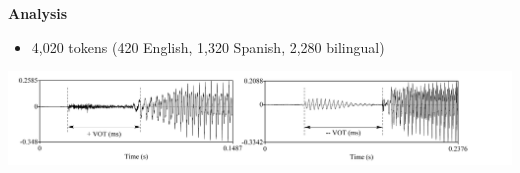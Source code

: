 \documentclass[a0paper,portrait,columns=2]{baposter}
\begin{document}
\begin{poster}
{\textbf{Analysis}
\vspace{.05in}
\begin{itemize}
	\item 4,020 tokens (420 English, 1,320 Spanish, 2,280 bilingual)
\end{itemize}
\vspace{-.2in}
\begin{center}	
	\includegraphics[width=1.05\textwidth]{praat2.png}
\end{center}

}







\end{poster}
\end{document}
